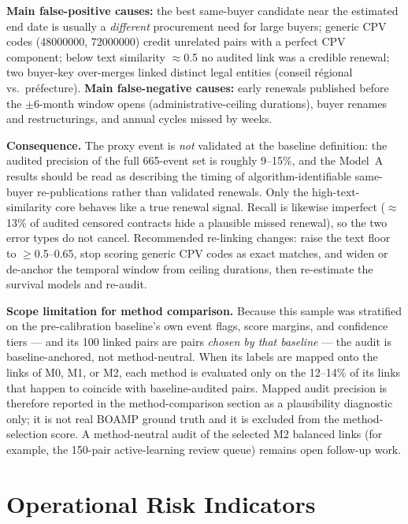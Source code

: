 \documentclass[12pt, a4paper]{article}
\begin{document}
\textbf{Main false-positive causes:} the best same-buyer candidate near the
estimated end date is usually a \emph{different} procurement need for large
buyers; generic CPV codes (48000000, 72000000) credit unrelated pairs with a
perfect CPV component; below text similarity $\approx$0.5 no audited link was a
credible renewal; two buyer-key over-merges linked distinct legal entities
(conseil r\'egional vs.\ pr\'efecture).
\textbf{Main false-negative causes:} early renewals published before the
$\pm 6$-month window opens (administrative-ceiling durations), buyer renames
and restructurings, and annual cycles missed by weeks.

\textbf{Consequence.} The proxy event is \emph{not} validated at the baseline
definition: the audited precision of the full 665-event set is roughly
9--15\%, and the Model~A results should be read as describing the timing of
algorithm-identifiable same-buyer re-publications rather than validated
renewals. Only the high-text-similarity core behaves like a true renewal
signal. Recall is likewise imperfect ($\approx$13\% of audited censored
contracts hide a plausible missed renewal), so the two error types do not
cancel. Recommended re-linking changes: raise the text floor to
$\geq$0.5--0.65, stop scoring generic CPV codes as exact matches, and widen or
de-anchor the temporal window from ceiling durations, then re-estimate the
survival models and re-audit.

\textbf{Scope limitation for method comparison.} Because this sample was
stratified on the pre-calibration baseline's own event flags, score margins,
and confidence tiers --- and its 100 linked pairs are pairs \emph{chosen by
that baseline} --- the audit is baseline-anchored, not method-neutral. When
its labels are mapped onto the links of M0, M1, or M2, each method is
evaluated only on the 12--14\% of its links that happen to coincide with
baseline-audited pairs. Mapped audit precision is therefore reported in the
method-comparison section as a plausibility diagnostic only; it is not real
BOAMP ground truth and it is excluded from the method-selection score. A
method-neutral audit of the selected M2 balanced links (for example, the
150-pair active-learning review queue) remains open follow-up work.

\section{Operational Risk Indicators}
\label{sec:operational-indicators}
\end{document}
